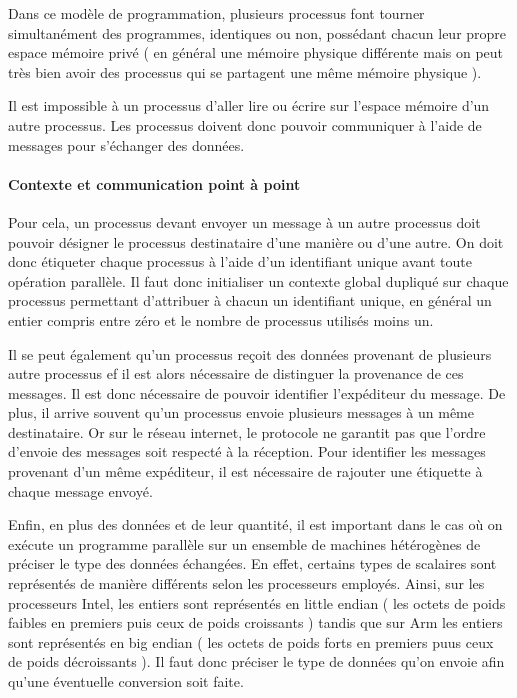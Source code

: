 \documentclass[fleqn,11pt]{article}
\begin{document}
Dans ce modèle de programmation, plusieurs processus font tourner 
simultanément des programmes,
identiques ou non, possédant chacun leur propre espace mémoire privé ( en général
une mémoire physique différente mais on peut très bien avoir des processus qui
se partagent une même mémoire physique ).

Il est impossible à un processus d'aller lire ou écrire sur l'espace mémoire d'un autre
processus. Les processus doivent donc pouvoir communiquer à l'aide de messages pour
s'échanger des données.

\paragraph{Contexte et communication point à point}

Pour cela, un processus devant envoyer un message à un autre processus doit
pouvoir désigner le processus destinataire d'une manière ou d'une autre.
On doit donc étiqueter chaque processus à l'aide d'un identifiant unique
avant toute opération parallèle. Il faut donc initialiser un contexte
global dupliqué sur chaque processus permettant d'attribuer à chacun un identifiant
unique, en général un entier compris entre zéro et le nombre 
de processus utilisés moins un.

Il se peut également qu'un processus reçoit des données provenant de plusieurs
autre processus ef il est alors nécessaire de distinguer la provenance de ces messages.
Il est donc nécessaire de pouvoir identifier l'expéditeur du message. De plus, il
arrive souvent qu'un processus envoie plusieurs messages à un même destinataire. Or
sur le réseau internet, le protocole ne garantit pas que l'ordre d'envoie
des messages soit respecté à la réception. Pour identifier les messages provenant
d'un même expéditeur, il est nécessaire de rajouter une étiquette à chaque message
envoyé.

Enfin, en plus des données et de leur quantité, il est important dans le cas où
on exécute un programme parallèle sur un ensemble de machines hétérogènes
de préciser le type des données échangées. En effet, certains types de scalaires
sont représentés de manière différents selon les processeurs employés. Ainsi,
sur les processeurs Intel, les entiers sont représentés en little endian ( les octets
de poids faibles en premiers puis ceux de poids croissants ) tandis que sur Arm
les entiers sont représentés en big endian ( les octets de poids forts en premiers
puus ceux de poids décroissants ). Il faut donc préciser le type de données qu'on
envoie afin qu'une éventuelle conversion soit faite.
\end{document}

